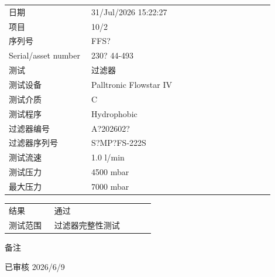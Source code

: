 \documentclass[UTF8,10pt,a4paper,fontset=fandol]{ctexart}
\newcommand{\fieldvalue}[1]{#1}
\newcommand{\handwritten}[1]{#1}
\begin{document}
\begin{tabular}{@{}p{0.28\linewidth}p{0.62\linewidth}@{}}
日期 &
\fieldvalue{31/Jul/2026 15:22:27}
\\
项目 &
\fieldvalue{10/2}
\\
序列号 &
\fieldvalue{FFS?}
\\
Serial/asset number &
\fieldvalue{230? 44-493}
\\
测试 &
\fieldvalue{过滤器}
\\
测试设备 &
\fieldvalue{Palltronic Flowstar IV}
\\
测试介质 &
\fieldvalue{C}
\\
测试程序 &
\fieldvalue{Hydrophobic}
\\
过滤器编号 &
\fieldvalue{A?202602?}
\\
过滤器序列号 &
\fieldvalue{S?MP?FS-222S}
\\
测试流速 &
\fieldvalue{1.0 l/min}
\\
测试压力 &
\fieldvalue{4500 mbar}
\\
最大压力 &
\fieldvalue{7000 mbar}
\\
\end{tabular}

\bigskip

\begin{tabular}{@{}p{0.28\linewidth}p{0.62\linewidth}@{}}
结果 &
\fieldvalue{通过}
\\
测试范围 &
\fieldvalue{过滤器完整性测试}
\\
\end{tabular}

\bigskip

\noindent
备注

\medskip

\fieldvalue{\handwritten{已审核 2026/6/9}}
\end{document}
